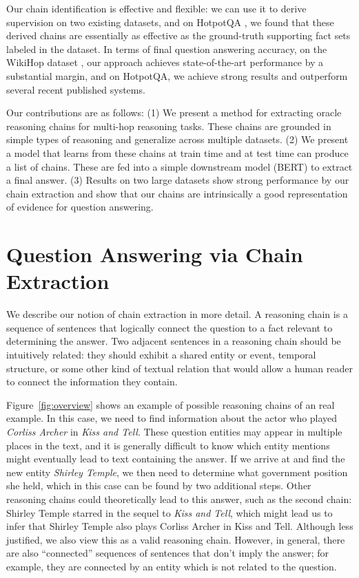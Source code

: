 \documentclass[11pt,a4paper]{article}
\begin{document}
Our chain identification is effective and flexible: we can use it to derive supervision on two existing datasets, and on HotpotQA \citep{yang2018hotpotqa}, we found that these derived chains are essentially as effective as the ground-truth supporting fact sets labeled in the dataset. In terms of final question answering accuracy, on the WikiHop dataset \citep{welbl2018constructing}, our approach achieves state-of-the-art performance by a substantial margin, and on HotpotQA, we achieve strong results and outperform several recent published systems.

Our contributions are as follows: (1) We present a method for extracting oracle reasoning chains for multi-hop reasoning tasks. These chains are grounded in simple types of reasoning and generalize across multiple datasets. (2) We present a model that learns from these chains at train time and at test time can produce a list of chains. These are fed into a simple downstream model (BERT) to extract a final answer. (3) Results on two large datasets show strong performance by our chain extraction and show that our chains are intrinsically a good representation of evidence for question answering.

\section{Question Answering via Chain Extraction}

We describe our notion of chain extraction in more detail. A reasoning chain is a sequence of sentences that logically connect the question to a fact relevant to determining the answer. Two adjacent sentences in a reasoning chain should be intuitively related: they should exhibit a shared entity or event, temporal structure, or some other kind of textual relation that would allow a human reader to connect the information they contain.

Figure~\ref{fig:overview} shows an example of possible reasoning chains of an real example. In this case, we need to find information about the actor who played \emph{Corliss Archer} in \emph{Kiss and Tell}. These question entities may appear in multiple places in the text, and it is generally difficult to know which entity mentions might eventually lead to text containing the answer. If we arrive at  and find the new entity \emph{Shirley Temple}, we then need to determine what government position she held, which in this case can be found by two additional steps. Other reasoning chains could theoretically lead to this answer, such as the second chain: Shirley Temple starred in the sequel to \emph{Kiss and Tell}, which might lead us to infer that Shirley Temple also plays Corliss Archer in Kiss and Tell. Although less justified, we also view this as a valid reasoning chain. However, in general, there are also ``connected'' sequences of sentences that don't imply the answer; for example, they are connected by an entity which is not related to the question.
\end{document}
